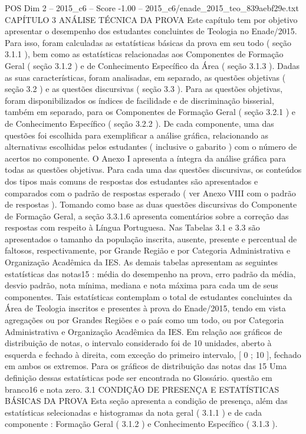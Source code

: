 \begin{textsample}{POS Dim 2 – 2015\_c6 – Score -1.00 – 2015\_c6/enade\_2015\_teo\_839aebf29e.txt}  \label{ex:f2_pos_242}
CAPÍTULO 3 ANÁLISE TÉCNICA DA PROVA Este capítulo tem por objetivo apresentar o desempenho dos estudantes concluintes de Teologia no Enade/2015.
Para isso, foram calculadas as estatísticas básicas da prova em seu todo ( seção 3.1.1 ), bem como as estatísticas relacionadas aos Componentes de Formação Geral ( seção 3.1.2 ) e de Conhecimento Específico da Área ( seção 3.1.3 ).
Dadas as suas características, foram analisadas, em separado, as questões objetivas ( seção 3.2 ) e as questões discursivas ( seção 3.3 ).
Para as questões objetivas, foram disponibilizados os índices de facilidade e de discriminação bisserial, também em separado, para os Componentes de Formação Geral ( seção 3.2.1 ) e de Conhecimento Específico ( seção 3.2.2 ).
De cada componente, uma das questões foi escolhida para exemplificar a análise gráfica, relacionando as alternativas escolhidas pelos estudantes ( inclusive o gabarito ) com o número de acertos no componente.
O Anexo I apresenta a íntegra da análise gráfica para todas as questões objetivas.
Para cada uma das questões discursivas, os conteúdos dos tipos mais comuns de respostas dos estudantes são apresentados e comparados com o padrão de respostas esperado ( ver Anexo VIII com o padrão de respostas ).
Tomando como base as duas questões discursivas do Componente de Formação Geral, a seção 3.3.1.6 apresenta comentários sobre a correção das respostas com respeito à Língua Portuguesa.
Nas Tabelas 3.1 e 3.3 são apresentados o tamanho da população inscrita, ausente, presente e percentual de faltosos, respectivamente, por Grande Região e por Categoria Administrativa e Organização Acadêmica da IES.
As demais tabelas apresentam as seguintes estatísticas das notas15 : média do desempenho na prova, erro padrão da média, desvio padrão, nota mínima, mediana e nota máxima para cada um de seus componentes.
Tais estatísticas contemplam o total de estudantes concluintes da Área de Teologia inscritos e presentes à prova do Enade/2015, tendo em vista agregações ou por Grandes Regiões e o país como um todo, ou por Categoria Administrativa e Organização Acadêmica da IES.
Em relação aos gráficos de distribuição de notas, o intervalo considerado foi de 10 unidades, aberto à esquerda e fechado à direita, com exceção do primeiro intervalo, [ 0 ; 10 ], fechado em ambos os extremos.
Para os gráficos de distribuição das notas das 15 Uma definição dessas estatísticas pode ser encontrada no Glossário. questão em branco16 e nota zero. 3.1 CONDIÇÃO DE PRESENÇA E ESTATÍSTICAS BÁSICAS DA PROVA Esta seção apresenta a condição de presença, além das estatísticas selecionadas e histogramas da nota geral ( 3.1.1 ) e de cada componente : Formação Geral ( 3.1.2 ) e Conhecimento Específico ( 3.1.3 ).

\end{textsample}
